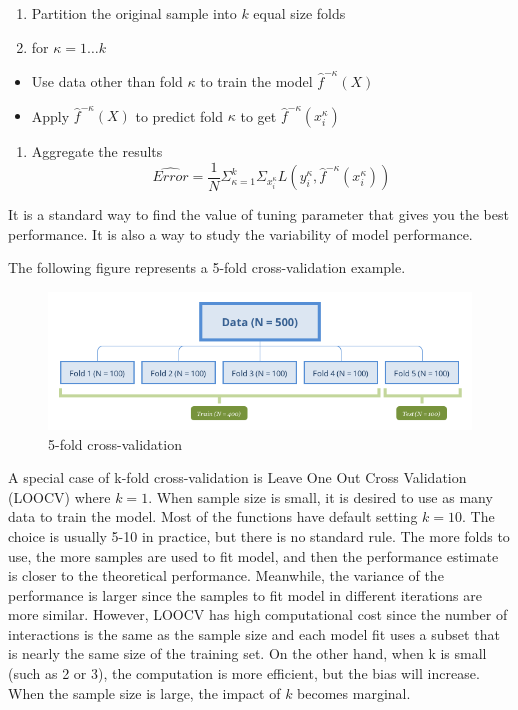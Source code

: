 \documentclass[12pt,]{krantz}
\providecommand{\tightlist}{%
  \setlength{\itemsep}{0pt}\setlength{\parskip}{0pt}}
\renewenvironment{quote}{\begin{VF}}{\end{VF}}
\begin{document}
\begin{quote}
\begin{enumerate}
\def\labelenumi{\arabic{enumi}.}
\tightlist
\item
  Partition the original sample into \(k\) equal size folds
\item
  for \(\kappa=1…k\)
\end{enumerate}

\begin{itemize}
\tightlist
\item
  Use data other than fold \(\kappa\) to train the model \(\hat{f}^{-\kappa}(X)\)
\item
  Apply \(\hat{f}^{-\kappa}(X)\) to predict fold \(\kappa\) to get \(\hat{f}^{-\kappa}(x_i^\kappa)\)
\end{itemize}

\begin{enumerate}
\def\labelenumi{\arabic{enumi}.}
\setcounter{enumi}{2}
\tightlist
\item
  Aggregate the results
  \[\hat{Error} = \frac{1}{N}\Sigma_{\kappa=1}^k\Sigma_{x_i^{\kappa}}L(y_i^{\kappa},\hat{f}^{-\kappa}(x_i^\kappa))\]
\end{enumerate}
\end{quote}

It is a standard way to find the value of tuning parameter that gives you the best performance. It is also a way to study the variability of model performance.

The following figure represents a 5-fold cross-validation example.

\begin{figure}
\centering
\includegraphics{images/cv5fold.png}
\caption{5-fold cross-validation}
\end{figure}

A special case of k-fold cross-validation is Leave One Out Cross Validation (LOOCV) where \(k=1\). When sample size is small, it is desired to use as many data to train the model. Most of the functions have default setting \(k=10\). The choice is usually 5-10 in practice, but there is no standard rule. The more folds to use, the more samples are used to fit model, and then the performance estimate is closer to the theoretical performance. Meanwhile, the variance of the performance is larger since the samples to fit model in different iterations are more similar. However, LOOCV has high computational cost since the number of interactions is the same as the sample size and each model fit uses a subset that is nearly the same size of the training set. On the other hand, when k is small (such as 2 or 3), the computation is more efficient, but the bias will increase. When the sample size is large, the impact of \(k\) becomes marginal.
\end{document}

